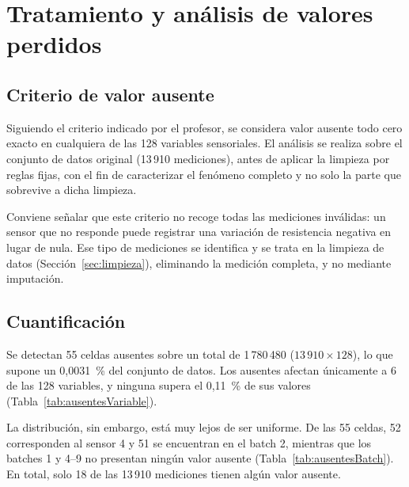 \section{Tratamiento y análisis de valores perdidos}
\label{sec:ausentes}

\subsection{Criterio de valor ausente}

Siguiendo el criterio indicado por el profesor, se considera valor ausente todo cero exacto
en cualquiera de las 128 variables sensoriales. El análisis se realiza sobre el conjunto de
datos original (13\,910 mediciones), antes de aplicar la limpieza por reglas fijas, con el fin
de caracterizar el fenómeno completo y no solo la parte que sobrevive a dicha limpieza.

Conviene señalar que este criterio no recoge todas las mediciones inválidas: un sensor que no
responde puede registrar una variación de resistencia negativa en lugar de nula. Ese tipo de
mediciones se identifica y se trata en la limpieza de datos (Sección~\ref{sec:limpieza}),
eliminando la medición completa, y no mediante imputación.

\subsection{Cuantificación}

Se detectan 55 celdas ausentes sobre un total de 1\,780\,480 ($13\,910 \times 128$), lo que
supone un 0,0031~\% del conjunto de datos. Los ausentes afectan únicamente a 6 de las 128
variables, y ninguna supera el 0,11~\% de sus valores (Tabla~\ref{tab:ausentesVariable}).

La distribución, sin embargo, está muy lejos de ser uniforme. De las 55 celdas, 52 corresponden
al sensor 4 y 51 se encuentran en el batch 2, mientras que los batches 1 y 4--9 no presentan
ningún valor ausente (Tabla~\ref{tab:ausentesBatch}). En total, solo 18 de las 13\,910
mediciones tienen algún valor ausente.

